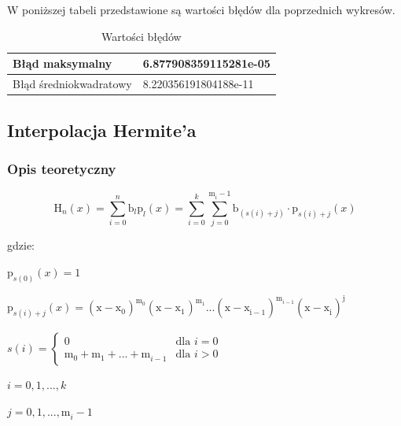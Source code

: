 \documentclass{article}
\begin{document}
W poniższej tabeli przedstawione są wartości błędów dla poprzednich wykresów.

\begin{table}[!ht]
    \centering
    \begin{tabular}{|l|l|}
    \hline
        Błąd maksymalny & 6.877908359115281e-05 \\ \hline
        Błąd średniokwadratowy & 8.220356191804188e-11 \\ \hline
    \end{tabular}
    \caption{Wartości błędów}
\end{table}

\newpage

\subsection{Interpolacja Hermite'a}

\subsubsection{Opis teoretyczny}

\[\mathrm{H}_{n}^{}(x) = \sum_{i = 0}^{n}\mathrm{b}_{l}^{}\mathrm{p}_{l}^{}(x) = 
\sum_{i = 0}^{k}\sum_{j=0}^{\mathrm{m}_{i}^{} - 1}\mathrm{b}_{(s(i) + j)}^{} \cdot 
\mathrm{p}_{s(i) + j}^{}(x) \]

\noindent
gdzie:

\bigbreak

\(\mathrm{p}_{s(0)}^{}(x) = 1\) 

\indent

\(\mathrm{p}_{s(i) + j}^{}(x) = \mathrm{(\mathrm{x - \mathrm{x}_{0}^{}}_{}^{})}_{}^{\mathrm{m}_{0}^{}}
\mathrm{(\mathrm{x - \mathrm{x}_{1}^{}}_{}^{})}_{}^{\mathrm{m}_{1}^{}}...
\mathrm{(\mathrm{x - \mathrm{x}_{i - 1}^{}}_{}^{})}_{}^{\mathrm{m}_{i-1}^{}}
\mathrm{(\mathrm{x - \mathrm{x}_{i}^{}}_{}^{})}_{}^{\mathrm{j}_{}^{}}\)

\indent

\(
s(i) = 
\begin{cases}
    0 & \text{dla } i = 0 \\
    \mathrm{m}_{0}^{} + \mathrm{m}_{1}^{} + ... + \mathrm{m}_{i - 1}^{} & \text{dla } i > 0
\end{cases}
\)

\indent

\(i = 0, 1, ..., k\)

\indent

\(j = 0,1,...,\mathrm{m}_{i}^{} - 1\)
\end{document}
